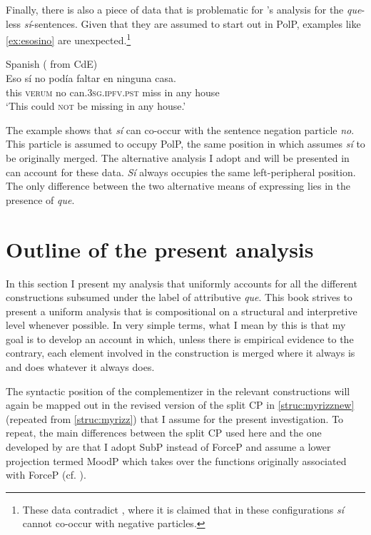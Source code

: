 Finally, there is also a piece of data that is problematic for \citeauthor{Hernanz2007}'s analysis for the  \emph{que}-less \emph{sí}-sentences. Given  that they are assumed to start out in PolP, examples like \eqref{ex:esosino} are unexpected.\footnote{These data contradict \citet[139: fn 8]{Hernanz2007}, where it is claimed that in these configurations \emph{sí} cannot co-occur with negative particles.}

\ea \label{ex:esosino} 
		Spanish (\citealt[94: 31a]{Kocher2017} from CdE) \\
\gll Eso sí no podía faltar en ninguna casa. \\
this \textsc{verum} no can.\textsc{3sg.ipfv.pst} miss in any house\\
\glt `This could \textsc{not} be missing in any house.' 
\z

The example shows that \emph{sí} can co-occur with the sentence negation particle \emph{no}. This particle is  assumed to occupy PolP,   the same position in which \citet{Hernanz2007} assumes \emph{sí}  to be originally merged.
The alternative analysis  I adopt and will be presented in  can account for these data.  \emph{Sí} always occupies the same left-peripheral position. The only difference between the two alternative means of expressing  lies in the presence of \emph{que}.





\section{Outline of the present analysis}\label{sec:presupanal}
 In this section I present my analysis that uniformly accounts for all the different constructions subsumed under the label of attributive \emph{que}. This book strives to present a uniform analysis that is compositional on a structural and interpretive level  whenever possible. In very simple terms, what I mean by this is that my goal is  to develop an account in which, unless there is empirical evidence to the contrary, each element involved in the construction  is merged where it always is and does whatever it always does. 
 
 The syntactic position of the complementizer in the relevant constructions will again be mapped out in the revised version of the split CP in \eqref{struc:myrizznew} (repeated from \eqref{struc:myrizz}) that I assume for the present investigation. To repeat, the main differences between the split CP used here and the one developed by \citeauthor{Rizzi1997} are that I adopt SubP instead of ForceP and assume a lower projection termed MoodP which takes over the functions originally associated with ForceP (cf. ).

